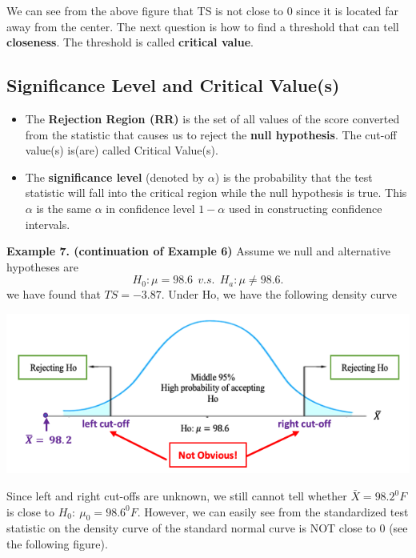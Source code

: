 \documentclass[
]{book}
\begin{document}
We can see from the above figure that TS is not close to \(0\) since it is located far away from the center. The next question is how to find a threshold that can tell \textbf{closeness}. The threshold is called \textbf{critical value}.

\hfill\break

\hypertarget{significance-level-and-critical-values}{%
\subsection{Significance Level and Critical Value(s)}\label{significance-level-and-critical-values}}

\begin{itemize}
\item
  The \textbf{Rejection Region (RR)} is the set of all values of the score converted from the statistic that causes us to reject the \textbf{null hypothesis}. The cut-off value(s) is(are) called Critical Value(s).
\item
  The \textbf{significance level} (denoted by \(\alpha\)) is the probability that the test statistic will fall into the critical region while the null hypothesis is true. This \(\alpha\) is the same \(\alpha\) in confidence level \(1-\alpha\) used in constructing confidence intervals.
\end{itemize}

\hfill\break

\textbf{Example 7. (continuation of Example 6) } Assume we null and alternative hypotheses are
\[ H_0: \mu = 98.6  \ \ v.s. \ \ H_a: \mu \ne 98.6.\]
we have found that \(TS = - 3.87\). Under Ho, we have the following density curve

\begin{center}\includegraphics[width=0.6\linewidth]{week08/example06BodyTempRR} \end{center}

Since left and right cut-offs are unknown, we still cannot tell whether \(\bar{X} = 98.2 ^0F\) is close to \(H_0: \ \mu_0 = 98.6^0F\). However, we can easily see from the standardized test statistic on the density curve of the standard normal curve is NOT close to 0 (see the following figure).
\end{document}
